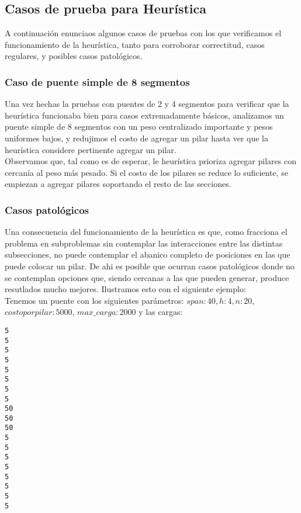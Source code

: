\subsection{Casos de prueba para Heurística}

A continuación enunciaos algunos casos de pruebas con los que verificamos el funcionamiento de la heurística, tanto para corroborar correctitud, casos regulares, y posibles casos patológicos.

\subsubsection{Caso de puente simple de 8 segmentos}
Una vez hechas la pruebas con puentes de 2 y 4 segmentos para verificar que la heurística funcionaba bien para casos extremadamente básicos, analizamos un puente simple de 8 segmentos con un peso centralizado importante y pesos uniformes bajos, y redujimos el costo de agregar un pilar hasta ver que la heurística considere pertinente agregar un pilar.\\

Observamos que, tal como es de esperar, le heurística prioriza agregar pilares con cercanía al peso más pesado. Si el costo de los pilares se reduce lo suficiente, se empiezan a agregar pilares soportando el resto de las secciones.\\


\subsubsection{Casos patológicos}

Una consecuencia del funcionamiento de la heurística es que, como fracciona el problema en subproblemas sin contemplar las interacciones entre las distintas subsecciones, no puede contemplar el abanico completo de posiciones en las que puede colocar un pilar. De ahi es posible que ocurran casos patológicos donde no se contemplan opciones que, siendo cercanas a las que pueden generar, produce resutlados mucho mejores. Ilustramos esto con el siguiente ejemplo:\\

Tenemos un puente con los siguientes parámetros: $span:40, h:4, n:20$, $costo por pilar: 5000$, $max\_carga: 2000$ y las cargas:\\

\begin{verbatim}
5
5
5
5
5
5
5
5
50
50
50
5
5
5
5
5
5
5
5
\end{verbatim}

